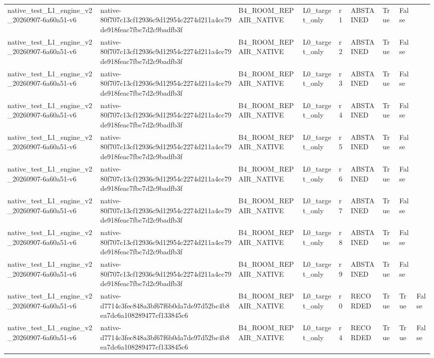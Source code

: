 \begin{tabular}{lllllllll}
native\_test\_L1\_engine\_v2\_20260907-6a60a51-v6 & native-80f707c13cf12936c9d12954c2274d211a4cc79de918feac7fbc7d2c9badfb3f & B4\_ROOM\_REPAIR\_NATIVE & L0\_target\_only & r1 & ABSTAINED & True & False &  \\
native\_test\_L1\_engine\_v2\_20260907-6a60a51-v6 & native-80f707c13cf12936c9d12954c2274d211a4cc79de918feac7fbc7d2c9badfb3f & B4\_ROOM\_REPAIR\_NATIVE & L0\_target\_only & r2 & ABSTAINED & True & False &  \\
native\_test\_L1\_engine\_v2\_20260907-6a60a51-v6 & native-80f707c13cf12936c9d12954c2274d211a4cc79de918feac7fbc7d2c9badfb3f & B4\_ROOM\_REPAIR\_NATIVE & L0\_target\_only & r3 & ABSTAINED & True & False &  \\
native\_test\_L1\_engine\_v2\_20260907-6a60a51-v6 & native-80f707c13cf12936c9d12954c2274d211a4cc79de918feac7fbc7d2c9badfb3f & B4\_ROOM\_REPAIR\_NATIVE & L0\_target\_only & r4 & ABSTAINED & True & False &  \\
native\_test\_L1\_engine\_v2\_20260907-6a60a51-v6 & native-80f707c13cf12936c9d12954c2274d211a4cc79de918feac7fbc7d2c9badfb3f & B4\_ROOM\_REPAIR\_NATIVE & L0\_target\_only & r5 & ABSTAINED & True & False &  \\
native\_test\_L1\_engine\_v2\_20260907-6a60a51-v6 & native-80f707c13cf12936c9d12954c2274d211a4cc79de918feac7fbc7d2c9badfb3f & B4\_ROOM\_REPAIR\_NATIVE & L0\_target\_only & r6 & ABSTAINED & True & False &  \\
native\_test\_L1\_engine\_v2\_20260907-6a60a51-v6 & native-80f707c13cf12936c9d12954c2274d211a4cc79de918feac7fbc7d2c9badfb3f & B4\_ROOM\_REPAIR\_NATIVE & L0\_target\_only & r7 & ABSTAINED & True & False &  \\
native\_test\_L1\_engine\_v2\_20260907-6a60a51-v6 & native-80f707c13cf12936c9d12954c2274d211a4cc79de918feac7fbc7d2c9badfb3f & B4\_ROOM\_REPAIR\_NATIVE & L0\_target\_only & r8 & ABSTAINED & True & False &  \\
native\_test\_L1\_engine\_v2\_20260907-6a60a51-v6 & native-80f707c13cf12936c9d12954c2274d211a4cc79de918feac7fbc7d2c9badfb3f & B4\_ROOM\_REPAIR\_NATIVE & L0\_target\_only & r9 & ABSTAINED & True & False &  \\
native\_test\_L1\_engine\_v2\_20260907-6a60a51-v6 & native-d7714c3fec848a3bf67f6b0da7de97d52bc4b8ea7dc6a108289477cf133845c6 & B4\_ROOM\_REPAIR\_NATIVE & L0\_target\_only & r0 & RECORDED & True & True & False \\
native\_test\_L1\_engine\_v2\_20260907-6a60a51-v6 & native-d7714c3fec848a3bf67f6b0da7de97d52bc4b8ea7dc6a108289477cf133845c6 & B4\_ROOM\_REPAIR\_NATIVE & L0\_target\_only & r4 & RECORDED & True & True & False \\

\end{tabular}
